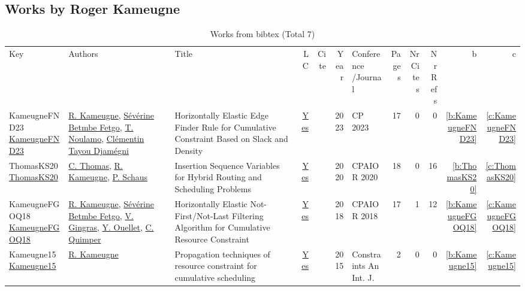 \subsection{Works by Roger Kameugne}
\label{sec:a10}
{\scriptsize
\begin{longtable}{>{\raggedright\arraybackslash}p{3cm}>{\raggedright\arraybackslash}p{6cm}>{\raggedright\arraybackslash}p{6.5cm}rrrp{2.5cm}rrrrr}
\rowcolor{white}\caption{Works from bibtex (Total 7)}\\ \toprule
\rowcolor{white}Key & Authors & Title & LC & Cite & Year & \shortstack{Conference\\/Journal} & Pages & \shortstack{Nr\\Cites} & \shortstack{Nr\\Refs} & b & c \\ \midrule\endhead
\bottomrule
\endfoot
KameugneFND23 \href{https://doi.org/10.4230/LIPIcs.CP.2023.20}{KameugneFND23} & \hyperref[auth:a10]{R. Kameugne}, \hyperref[auth:a11]{S{\'{e}}v{\'{e}}rine Betmbe Fetgo}, \hyperref[auth:a12]{T. Noulamo}, \hyperref[auth:a13]{Cl{\'{e}}mentin Tayou Djam{\'{e}}gni} & Horizontally Elastic Edge Finder Rule for Cumulative Constraint Based on Slack and Density & \href{works/KameugneFND23.pdf}{Yes} & \cite{KameugneFND23} & 2023 & CP 2023 & 17 & 0 & 0 & \ref{b:KameugneFND23} & \ref{c:KameugneFND23}\\
ThomasKS20 \href{https://doi.org/10.1007/978-3-030-58942-4\_30}{ThomasKS20} & \hyperref[auth:a847]{C. Thomas}, \hyperref[auth:a10]{R. Kameugne}, \hyperref[auth:a148]{P. Schaus} & Insertion Sequence Variables for Hybrid Routing and Scheduling Problems & \href{works/ThomasKS20.pdf}{Yes} & \cite{ThomasKS20} & 2020 & CPAIOR 2020 & 18 & 0 & 16 & \ref{b:ThomasKS20} & \ref{c:ThomasKS20}\\
KameugneFGOQ18 \href{https://doi.org/10.1007/978-3-319-93031-2\_23}{KameugneFGOQ18} & \hyperref[auth:a10]{R. Kameugne}, \hyperref[auth:a11]{S{\'{e}}v{\'{e}}rine Betmbe Fetgo}, \hyperref[auth:a316]{V. Gingras}, \hyperref[auth:a52]{Y. Ouellet}, \hyperref[auth:a37]{C. Quimper} & Horizontally Elastic Not-First/Not-Last Filtering Algorithm for Cumulative Resource Constraint & \href{works/KameugneFGOQ18.pdf}{Yes} & \cite{KameugneFGOQ18} & 2018 & CPAIOR 2018 & 17 & 1 & 12 & \ref{b:KameugneFGOQ18} & \ref{c:KameugneFGOQ18}\\
Kameugne15 \href{https://doi.org/10.1007/s10601-015-9227-5}{Kameugne15} & \hyperref[auth:a10]{R. Kameugne} & Propagation techniques of resource constraint for cumulative scheduling & \href{works/Kameugne15.pdf}{Yes} & \cite{Kameugne15} & 2015 & Constraints An Int. J. & 2 & 0 & 0 & \ref{b:Kameugne15} & \ref{c:Kameugne15}\\

\end{longtable}}
